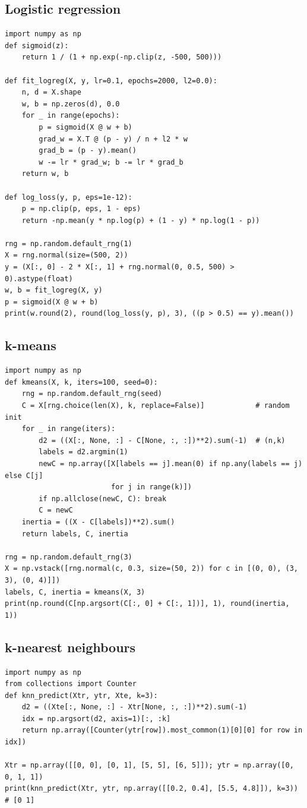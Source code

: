 \subsection{Logistic regression}
\begin{lstlisting}[style=python]
import numpy as np
def sigmoid(z):
    return 1 / (1 + np.exp(-np.clip(z, -500, 500)))

def fit_logreg(X, y, lr=0.1, epochs=2000, l2=0.0):
    n, d = X.shape
    w, b = np.zeros(d), 0.0
    for _ in range(epochs):
        p = sigmoid(X @ w + b)
        grad_w = X.T @ (p - y) / n + l2 * w
        grad_b = (p - y).mean()
        w -= lr * grad_w; b -= lr * grad_b
    return w, b

def log_loss(y, p, eps=1e-12):
    p = np.clip(p, eps, 1 - eps)
    return -np.mean(y * np.log(p) + (1 - y) * np.log(1 - p))

rng = np.random.default_rng(1)
X = rng.normal(size=(500, 2))
y = (X[:, 0] - 2 * X[:, 1] + rng.normal(0, 0.5, 500) > 0).astype(float)
w, b = fit_logreg(X, y)
p = sigmoid(X @ w + b)
print(w.round(2), round(log_loss(y, p), 3), ((p > 0.5) == y).mean())
\end{lstlisting}

\subsection{k-means}
\begin{lstlisting}[style=python]
import numpy as np
def kmeans(X, k, iters=100, seed=0):
    rng = np.random.default_rng(seed)
    C = X[rng.choice(len(X), k, replace=False)]            # random init
    for _ in range(iters):
        d2 = ((X[:, None, :] - C[None, :, :])**2).sum(-1)  # (n,k)
        labels = d2.argmin(1)
        newC = np.array([X[labels == j].mean(0) if np.any(labels == j) else C[j]
                         for j in range(k)])
        if np.allclose(newC, C): break
        C = newC
    inertia = ((X - C[labels])**2).sum()
    return labels, C, inertia

rng = np.random.default_rng(3)
X = np.vstack([rng.normal(c, 0.3, size=(50, 2)) for c in [(0, 0), (3, 3), (0, 4)]])
labels, C, inertia = kmeans(X, 3)
print(np.round(C[np.argsort(C[:, 0] + C[:, 1])], 1), round(inertia, 1))
\end{lstlisting}

\subsection{k-nearest neighbours}
\begin{lstlisting}[style=python]
import numpy as np
from collections import Counter
def knn_predict(Xtr, ytr, Xte, k=3):
    d2 = ((Xte[:, None, :] - Xtr[None, :, :])**2).sum(-1)
    idx = np.argsort(d2, axis=1)[:, :k]
    return np.array([Counter(ytr[row]).most_common(1)[0][0] for row in idx])

Xtr = np.array([[0, 0], [0, 1], [5, 5], [6, 5]]); ytr = np.array([0, 0, 1, 1])
print(knn_predict(Xtr, ytr, np.array([[0.2, 0.4], [5.5, 4.8]]), k=3))   # [0 1]
\end{lstlisting}

